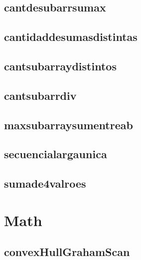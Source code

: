 \documentclass{article}
\begin{document}
\subsection{cantdesubarrsumax}


\subsection{cantidaddesumasdistintas}


\subsection{cantsubarraydistintos}


\subsection{cantsubarrdiv}


\subsection{maxsubarraysumentreab}


\subsection{secuencialargaunica}


\subsection{sumade4valroes}


\section{Math}
\subsection{convexHullGrahamScan}

\end{document}
